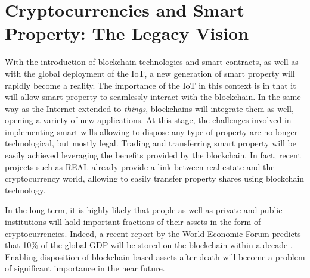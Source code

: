 \section{Cryptocurrencies and Smart Property: The Legacy Vision} %
\label{sec:cryptocurrencies_and_smart_property_the_legacy_vision}

With the introduction of blockchain technologies and smart contracts, as well as with the global deployment of the IoT, a new generation of smart property will rapidly become a reality.
The importance of the IoT in this context is in that it will allow smart property to seamlessly interact with the blockchain. 
In the same way as the Internet extended to \textit{things}, blockchains will integrate them as well, opening a variety of new applications.
At this stage, the challenges involved in implementing smart wills allowing to dispose any type of property are no longer technological, but mostly legal. Trading and transferring smart property will be easily achieved leveraging the benefits provided by the blockchain.%
In fact, recent projects such as REAL \cite{REAL} already provide a link between real estate and the cryptocurrency world, allowing to easily transfer property shares using blockchain technology.


In the long term, it is highly likely that people as well as private and public institutions will hold important fractions of their assets in the form of cryptocurrencies. Indeed, a recent report by the World Economic Forum predicts that 10\% of the global GDP will be stored on the blockchain within a decade \cite{WEF2017}.  
Enabling disposition of blockchain-based assets after death will become a problem of significant importance in the near future.




